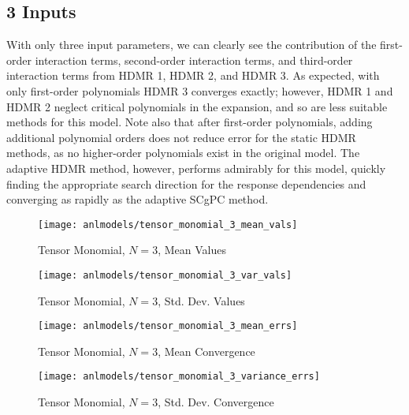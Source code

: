 \subsection{3 Inputs}
With only three input parameters, we can clearly see the contribution of the first-order interaction terms,
second-order interaction terms, and third-order interaction terms from HDMR 1, HDMR 2, and HDMR 3.  As
expected, with only first-order polynomials HDMR 3 converges exactly; however, HDMR 1 and HDMR 2 neglect
critical polynomials in the expansion, and so are less suitable methods for this model.  Note also that after
first-order polynomials, adding additional polynomial orders does not reduce error for the static HDMR
methods, as no higher-order polynomials exist in the original model.
The adaptive HDMR method, however, performs admirably for this model, quickly finding the appropriate search
direction for the response dependencies and converging as rapidly as the adaptive SCgPC method.
\begin{figure}[H]
  \centering
  \texttt{[image: anlmodels/tensor\_monomial\_3\_mean\_vals]}
  \caption{Tensor Monomial, $N=3$, Mean Values}
  \label{fig:tensormono mean values 3}
\end{figure}
\begin{figure}[H]
  \centering
  \texttt{[image: anlmodels/tensor\_monomial\_3\_var\_vals]}
  \caption{Tensor Monomial, $N=3$, Std. Dev. Values}
  \label{fig:tensormono var values 3}
\end{figure}

\begin{figure}[H]
  \centering
  \texttt{[image: anlmodels/tensor\_monomial\_3\_mean\_errs]}
  \caption{Tensor Monomial, $N=3$, Mean Convergence}
  \label{fig:tensormono mean errors 3}
\end{figure}
\begin{figure}[H]
  \centering
  \texttt{[image: anlmodels/tensor\_monomial\_3\_variance\_errs]}
  \caption{Tensor Monomial, $N=3$, Std. Dev. Convergence}
  \label{fig:tensormono var errors 3}
\end{figure}




